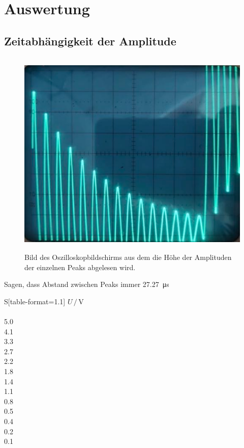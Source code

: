 \section{Auswertung}
\label{sec:Auswertung}

\subsection{Zeitabhängigkeit der Amplitude}
\label{sec:Zeitabhängigkeit der Amplitude}

\begin{figure} [H]
  \centering
  \includegraphics[height=10cm]{content/Bilder/Aufgabe_a.pdf}
  \caption{Bild des Oszilloskopbildschirms aus dem die Höhe der Amplituden der einzelnen Peaks abgelesen wird.}
  \label{fig:aufgabe a}
\end{figure}

Sagen, dass Abstand zwischen Peaks immer \qty{27,27}{\micro\second}
\begin{table}
  \centering
  \caption{Amplitude der einzelnen Peaks aus \autoref{fig:aufgabe a}.}
  \label{tab:Aufgabe a}
  \begin{tabular}{S[table-format=1.1]}
    \toprule
    {$U\,/\,\unit{\volt}$} \\
     \\
    5.0 \\
    4.1 \\
    3.3 \\
    2.7 \\
    2.2 \\
    1.8 \\
    1.4 \\
    1.1 \\
    0.8 \\
    0.5 \\
    0.4 \\
    0.2 \\
    0.1 \\
    \bottomrule
  \end{tabular}
\end{table}

